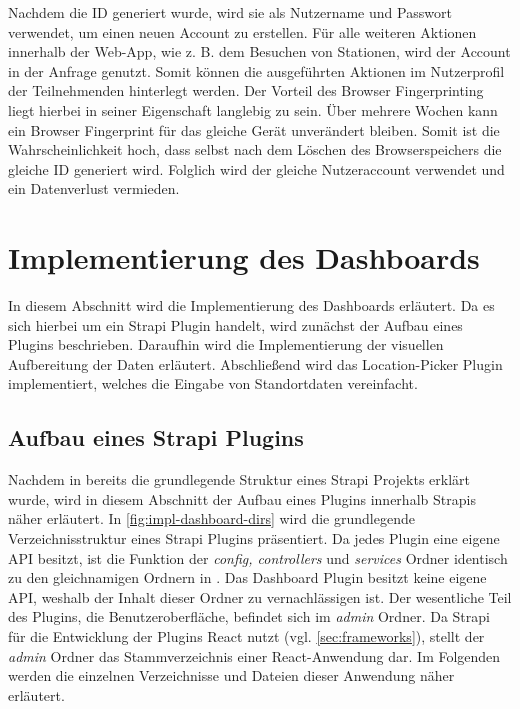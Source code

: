Nachdem die ID generiert wurde, wird sie als Nutzername und Passwort verwendet,
um einen neuen Account zu erstellen. Für alle weiteren Aktionen innerhalb der
Web-App, wie z. B. dem Besuchen von Stationen, wird der Account in der Anfrage
genutzt. Somit können die ausgeführten Aktionen im Nutzerprofil der
Teilnehmenden hinterlegt werden. Der Vorteil des Browser Fingerprinting liegt
hierbei in seiner Eigenschaft langlebig zu sein. Über mehrere Wochen kann
ein Browser Fingerprint für das gleiche Gerät unverändert bleiben. Somit ist die
Wahrscheinlichkeit hoch, dass selbst nach dem Löschen des Browserspeichers die
gleiche ID generiert wird. Folglich wird der gleiche Nutzeraccount verwendet und
ein Datenverlust vermieden.

\section{Implementierung des Dashboards} \label{sec:impl-dashboard}

In diesem Abschnitt wird die Implementierung des Dashboards erläutert. Da es
sich hierbei um ein Strapi Plugin handelt, wird zunächst der Aufbau eines
Plugins beschrieben. Daraufhin wird die Implementierung der visuellen
Aufbereitung der Daten erläutert. Abschließend wird das Location-Picker Plugin
implementiert, welches die Eingabe von Standortdaten vereinfacht.

\subsection{Aufbau eines Strapi Plugins}

Nachdem in  bereits die grundlegende
Struktur eines Strapi Projekts erklärt wurde, wird in diesem Abschnitt der
Aufbau eines Plugins innerhalb Strapis näher erläutert. In
\autoref{fig:impl-dashboard-dirs} wird die grundlegende Verzeichnisstruktur
eines Strapi Plugins präsentiert. Da jedes Plugin eine eigene API besitzt, ist
die Funktion der \textit{config, controllers} und \textit{services} Ordner
identisch zu den gleichnamigen Ordnern in .
Das Dashboard Plugin besitzt keine eigene API, weshalb der Inhalt dieser Ordner
zu vernachlässigen ist. Der wesentliche Teil des Plugins, die
Benutzeroberfläche, befindet sich im \textit{admin} Ordner. Da Strapi für die
Entwicklung der Plugins React nutzt (vgl. \autoref{sec:frameworks}), stellt der
\textit{admin} Ordner das Stammverzeichnis einer React-Anwendung dar. Im
Folgenden werden die einzelnen Verzeichnisse und Dateien dieser Anwendung näher erläutert.

